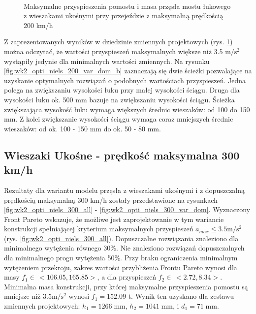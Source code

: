 \begin{figure}[hbt!]
	\centering
	\\
	\captionsetup{justification=centering}
	\caption{Maksymalne przyspieszenia pomostu i masa przęsła mostu łukowego z wieszakami ukośnymi przy przejeździe z maksymalną prędkością 200 km/h}
	\label{fig:wk2_opti_niels_200_var_dom}
\end{figure}

\pagebreak[4]
Z zaprezentowanych wyników w dziedzinie zmiennych projektowych (rys. \ref{fig:wk2_opti_niels_200_var_dom}) można odczytać, że wartości przyspieszeń maksymalnych większe niż 3.5 $\mathrm{m/s^2}$ wystąpiły jedynie dla minimalnych wartości zmiennych. Na rysunku \ref{fig:wk2_opti_niels_200_var_dom_b} zaznaczają się dwie ścieżki pozwalające na uzyskanie optymalnych rozwiązań o podobnych wartościach przyspieszeń. Jedna polega na zwiększaniu wysokości łuku przy małej wysokości ściągu. Druga dla wysokości łuku ok. 500 mm bazuje na zwiększaniu wysokości ściągu. Ścieżka zwiększająca wysokość łuku wymaga większych średnic wieszaków: od 100 do 150 mm. Z kolei zwiększanie wysokości ściągu wymaga coraz mniejszych średnic wieszaków: od ok. 100 - 150 mm do ok. 50 - 80 mm.







\pagebreak[4]
\subsection{Wieszaki Ukośne - prędkość maksymalna 300 km/h}


Rezultaty dla wariantu modelu przęsła z wieszakami ukośnymi i z dopuszczalną prędkością maksymalną 300 km/h zostały przedstawione na rysunkach \ref{fig:wk2_opti_niels_300_all} - \ref{fig:wk2_opti_niels_300_var_dom}. Wyznaczony Front Pareto wskazuje, że możliwe jest zaprojektowanie w tym wariancie konstrukcji spełniającej kryterium maksymalnych przyspieszeń $a_{max}\le 3.5 \mathrm{m/s^2}$ (rys. \ref{fig:wk2_opti_niels_300_all}). 
Dopuszczalne rozwiązania znaleziono dla minimalnego wytężenia równego 30\%. Nie znaleziono rozwiązań dopuszczalnych dla minimalnego progu wytężenia 50\%. Przy braku ograniczenia minimalnym wytężeniem przekroju, zakres wartości przybliżenia Frontu Pareto wynosi dla masy $f_1 \in\,<106.05,165.85>$, a dla przyspieszeń $f_2 \in\,<2.72,8.34>$. Minimalna masa konstrukcji, przy której maksymalne przyspieszenia pomostu są mniejsze niż $3.5 \mathrm{m/s^2}$ wynosi $f_1 = 152.09$ t. Wynik ten uzyskano dla zestawu zmiennych projektowych: $h_1 = 1266\;\mathrm{mm}$, $h_2 = 1041\;\mathrm{mm}$, i $d_1 = 71\;\mathrm{mm}$.

